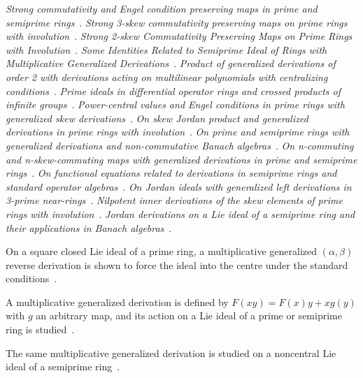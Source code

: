 \noindent\emph{Strong commutativity and Engel condition preserving maps in prime and semiprime rings}~\cite{LibStrongCommutativityAndEngel2012}.
\noindent\emph{Strong 3-skew commutativity preserving maps on prime rings with involution}~\cite{LibStrongSkewCommutativityPreserving2023}.
\noindent\emph{Strong 2-skew Commutativity Preserving Maps on Prime Rings with Involution}~\cite{LibStrongSkewCommutativityPreserving2019}.
\noindent\emph{Some Identities Related to Semiprime Ideal of Rings with Multiplicative Generalized Derivations}~\cite{LibSomeIdentitiesRelatedTo2024}.
\noindent\emph{Product of generalized derivations of order 2 with derivations acting on multilinear polynomials with centralizing conditions}~\cite{LibProductOfGeneralizedDerivations2024}.
\noindent\emph{Prime ideals in differential operator rings and crossed products of infinite groups}~\cite{LibPrimeIdealsInDifferential1987}.
\noindent\emph{Power-central values and Engel conditions in prime rings with generalized skew derivations}~\cite{LibPowerCentralValuesAnd2021}.
\noindent\emph{On skew Jordan product and generalized derivations in prime rings with involution}~\cite{LibOnSkewJordanProduct2024}.
\noindent\emph{On prime and semiprime rings with generalized derivations and non-commutative Banach algebras}~\cite{LibOnPrimeAndSemiprime2016}.
\noindent\emph{On n-commuting and n-skew-commuting maps with generalized derivations in prime and semiprime rings}~\cite{LibOnNCommutingAnd2011}.
\noindent\emph{On functional equations related to derivations in semiprime rings and standard operator algebras}~\cite{LibOnFunctionalEquationsRelated2012}.
\noindent\emph{On Jordan ideals with generalized left derivations in 3-prime near-rings}~\cite{LibOnJordanIdealsWith2023}.
\noindent\emph{Nilpotent inner derivations of the skew elements of prime rings with involution}~\cite{LibNilpotentInnerDerivationsOf1991}.
\noindent\emph{Jordan derivations on a Lie ideal of a semiprime ring and their applications in Banach algebras}~\cite{LibJordanDerivationsOnA2016}.

On a square closed Lie ideal of a prime ring, a multiplicative generalized $(\alpha,\beta)$ reverse derivation is shown to force the ideal into the centre under the standard conditions~\cite{WlSquareClosedLie2021}.

A multiplicative generalized derivation is defined by $F(xy)=F(x)y+xg(y)$ with $g$ an arbitrary map, and its action on a Lie ideal of a prime or semiprime ring is studied~\cite{WlOnLieIdeals2015}.

The same multiplicative generalized derivation is studied on a noncentral Lie ideal of a semiprime ring~\cite{WlMultiplicativeGeneralizedD2017}.

